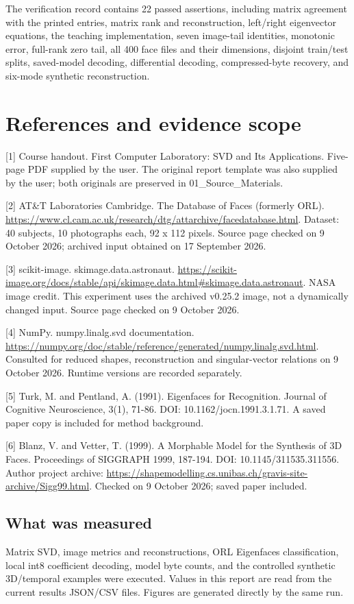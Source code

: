 \documentclass[a4paper,11pt]{article}
\begin{document}
The verification record contains 22 passed assertions, including matrix agreement with the printed entries, matrix rank and reconstruction, left/right eigenvector equations, the teaching implementation, seven image-tail identities, monotonic error, full-rank zero tail, all 400 face files and their dimensions, disjoint train/test splits, saved-model decoding, differential decoding, compressed-byte recovery, and six-mode synthetic reconstruction.

\clearpage
\section*{References and evidence scope}
[1] Course handout. First Computer Laboratory: SVD and Its Applications. Five-page PDF supplied by the user. The original report template was also supplied by the user; both originals are preserved in 01\_Source\_Materials.

[2] AT\&T Laboratories Cambridge. The Database of Faces (formerly ORL). \url{https://www.cl.cam.ac.uk/research/dtg/attarchive/facedatabase.html}. Dataset: 40 subjects, 10 photographs each, 92 x 112 pixels. Source page checked on 9 October 2026; archived input obtained on 17 September 2026.

[3] scikit-image. skimage.data.astronaut. \url{https://scikit-image.org/docs/stable/api/skimage.data.html#skimage.data.astronaut}. NASA image credit. This experiment uses the archived v0.25.2 image, not a dynamically changed input. Source page checked on 9 October 2026.

[4] NumPy. numpy.linalg.svd documentation. \url{https://numpy.org/doc/stable/reference/generated/numpy.linalg.svd.html}. Consulted for reduced shapes, reconstruction and singular-vector relations on 9 October 2026. Runtime versions are recorded separately.

[5] Turk, M. and Pentland, A. (1991). Eigenfaces for Recognition. Journal of Cognitive Neuroscience, 3(1), 71-86. DOI: 10.1162/jocn.1991.3.1.71. A saved paper copy is included for method background.

[6] Blanz, V. and Vetter, T. (1999). A Morphable Model for the Synthesis of 3D Faces. Proceedings of SIGGRAPH 1999, 187-194. DOI: 10.1145/311535.311556. Author project archive: \url{https://shapemodelling.cs.unibas.ch/gravis-site-archive/Sigg99.html}. Checked on 9 October 2026; saved paper included.

\subsection*{What was measured}
Matrix SVD, image metrics and reconstructions, ORL Eigenfaces classification, local int8 coefficient decoding, model byte counts, and the controlled synthetic 3D/temporal examples were executed. Values in this report are read from the current results JSON/CSV files. Figures are generated directly by the same run.
\end{document}
